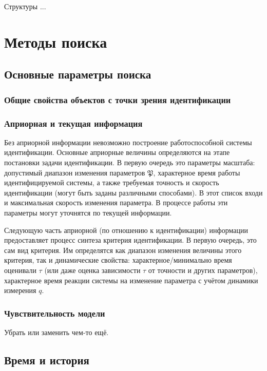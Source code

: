 \documentclass[a4paper,12pt]{article}
\begin{document}
Структуры ...



\FloatBarrier
\section{Методы поиска}

\subsection{Основные параметры поиска}


\subsubsection{Общие свойства объектов с точки зрения идентификации}

\subsubsection{Априорная и текущая информация}

Без априорной информации невозможно построение
работоспособной системы идентификации. Основные
априорные величины определяются на этапе постановки
задачи идентификации. В первую очередь это
параметры масштаба: допустимый диапазон
изменения параметров \( \mathfrak{P}\),
характерное время работы
идентифицируемой системы, а также
требуемая точность и скорость идентификации
(могут быть заданы различными способами).
В этот список входи и максимальная скорость изменения параметра.
В процессе работы эти параметры могут уточнятся по текущей информации.

Следующую часть априорной (по отношению к идентификации) информации
предоставляет процесс синтеза критерия идентификации.
В первую очередь, это сам вид критерия. Им определятся
как диапазон изменения величины этого критерия, так и
динамические свойства: характерное/минимально время
оценивали \(\tau\) (или даже оценка зависимости $\tau$ от точности и других параметров),
характерное время реакции системы на изменение
параметра с учётом динамики измерения \(q\).


\subsubsection{Чувствительность модели}

Убрать или заменить чем-то ещё.


\subsection{Время и история}
\end{document}
